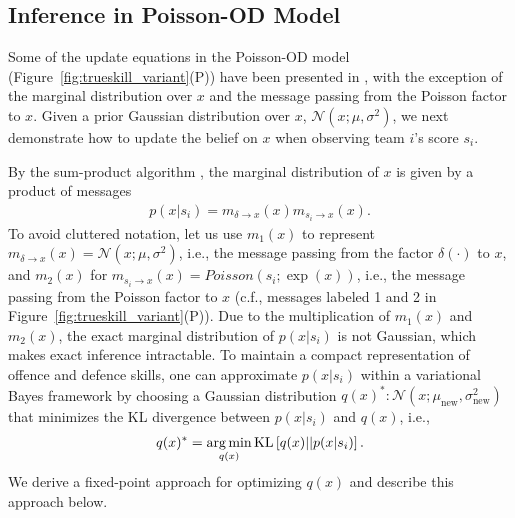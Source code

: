 \subsection{Inference in Poisson-OD Model}
\label{sec:PoissonInference}

Some of the update equations in the Poisson-OD model
(Figure~\ref{fig:trueskill_variant}(P)) have been presented in
\cite{herbrich06569}, with the exception of the marginal distribution
over $x$ and the message passing from the Poisson factor to $x$. Given
a prior Gaussian distribution over $x$, $\mathcal{N}(x;\mu,
\sigma^2)$, we next
demonstrate how to update the belief on $x$ when observing
team $i$'s score $s_i$.

By the sum-product algorithm \cite{kschischang01498}, the
marginal distribution of $x$ is given by a product of messages
\begin{align}\label{eq:marginal}
    p(x|s_i) = m_{\delta \rightarrow x}(x) m_{s_i \rightarrow x}(x).
\end{align}
\unindent To avoid cluttered notation, let us use $m_1(x)$ to represent
$m_{\delta \rightarrow x}(x) = \mathcal{N}(x;\mu,\sigma^2)$, i.e., the message
passing from the factor $\delta(\cdot)$ to $x$, and $m_2(x)$ for
$m_{s_i\rightarrow x}(x) = Poisson(s_i;\exp(x))$, i.e.,
the message passing from the Poisson
factor to $x$ (c.f., messages labeled 1 and 2 in
Figure~\ref{fig:trueskill_variant}(P)). Due to the multiplication of
$m_{1}(x)$ and $m_{2}(x)$, the exact marginal distribution of
$p(x|s_i)$ is not Gaussian, which makes exact inference
intractable. To maintain a compact representation of offence and
defence skills, one can approximate $p(x|s_i)$ within a variational
Bayes framework by %
choosing a Gaussian distribution $q(x)^*:
\mathcal{N}(x;\mu_{\text{new}}, \sigma_{\text{new}}^2)$ that minimizes
the KL divergence between $p(x|s_i)$ and $q(x)$, i.e.,
\begin{align}\label{eq:marginal2}
    q(x)^* = \argmin_{q(x)} \text{KL}\left[q(x)|| p(x|s_i)\right].
\end{align}
We derive a fixed-point approach for optimizing $q(x)$ \cite{Beal:EMFixedPoint02} and describe this approach below.

